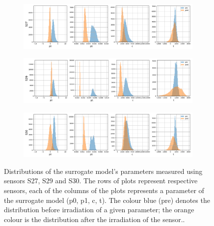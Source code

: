 \begin{figure}[H]
\centering

\begin{subfigure}[b]{1.\textwidth}
    \centering
    \includegraphics[width=\linewidth]{figures/chapter4/surrogates/p1_S27_histos.png}
  \end{subfigure}

\begin{subfigure}[b]{1.\textwidth}
    \centering
    \includegraphics[width=\linewidth]{figures/chapter4/surrogates/p1_S29_histos.png}
  \end{subfigure}

\begin{subfigure}[b]{1.\textwidth}
    \centering
    \includegraphics[width=\linewidth]{figures/chapter4/surrogates/p1_S30_histos.png}
  \end{subfigure}

  \caption[Surrogate parameters distribution part2]{Distributions of the surrogate model's parameters measured using sensors S27, S29 and S30. The rows of plots represent respective sensors, each of the columns of the plots represents a parameter of the surrogate model (p0, p1, c, t).  The colour blue (pre) denotes the distribution before irradiation of a given parameter; the orange colour is the distribution after the irradiation of the sensor..}
\label{plot:sensor_surrogate_p2}
\end{figure}


